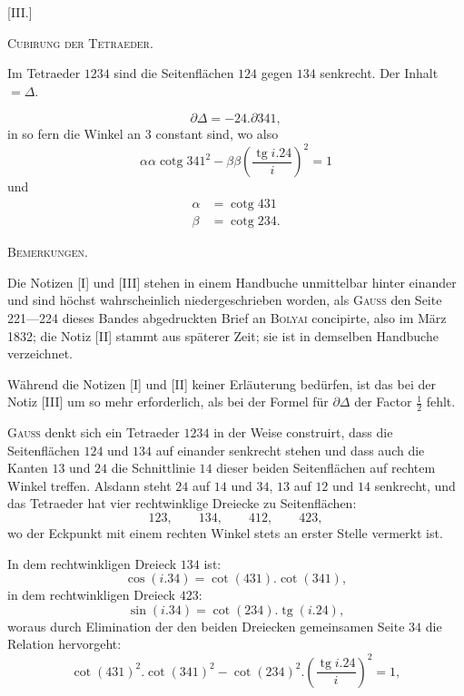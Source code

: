 %
\begin{center}[III.]\end{center}
\begin{center}\textsc{Cubirung der Tetraeder.}\end{center}
Im Tetraeder $1234$ sind die Seitenflächen $124$ gegen $134$ senkrecht. Der Inhalt $=\Delta$.
\begin{center}\end{center}
\[
\partial\Delta=-24.\partial341,
\]
in so fern die Winkel an $3$ constant sind, wo also
\[
\alpha\alpha\operatorname{cotg}341^{2}-\beta\beta\left(\frac{\operatorname{tg}i.24}{i}\right)^{2}=1
\]
und
\[
\begin{aligned}
\alpha&=\operatorname{cotg}431\\
\beta&=\operatorname{cotg}234.
\end{aligned}
\]

\begin{center}\textsc{Bemerkungen.}\end{center}
\begingroup\small
Die Notizen [I] und [III] stehen in einem Handbuche unmittelbar hinter einander und sind höchst wahrscheinlich niedergeschrieben worden, als \textsc{Gauss} den Seite 221—224 dieses Bandes abgedruckten Brief an \textsc{Bolyai} concipirte, also im März 1832; die Notiz [II] stammt aus späterer Zeit; sie ist in demselben Handbuche verzeichnet.

Während die Notizen [I] und [II] keiner Erläuterung bedürfen, ist das bei der Notiz [III] um so mehr erforderlich, als bei der Formel für $\partial\Delta$ der Factor $\frac{1}{2}$ fehlt.

\textsc{Gauss} denkt sich ein Tetraeder $1234$ in der Weise construirt, dass die Seitenflächen $124$ und $134$ auf einander senkrecht stehen und dass auch die Kanten $13$ und $24$ die Schnittlinie $14$ dieser beiden Seitenflächen auf rechtem Winkel treffen. Alsdann steht $24$ auf $14$ und $34$, $13$ auf $12$ und $14$ senkrecht, und das Tetraeder hat vier rechtwinklige Dreiecke zu Seitenflächen:
\[
123,\qquad134,\qquad412,\qquad423,
\]
wo der Eckpunkt mit einem rechten Winkel stets an erster Stelle vermerkt ist.

In dem rechtwinkligen Dreieck $134$ ist:
\[
\cos(i.34)=\cot(431).\cot(341),
\]
in dem rechtwinkligen Dreieck $423$:
\[
\sin(i.34)=\cot(234).\operatorname{tg}(i.24),
\]
woraus durch Elimination der den beiden Dreiecken gemeinsamen Seite $34$ die Relation hervorgeht:
\[
\cot(431)^{2}.\cot(341)^{2}-\cot(234)^{2}.\left(\frac{\operatorname{tg}i.24}{i}\right)^{2}=1,
\]
